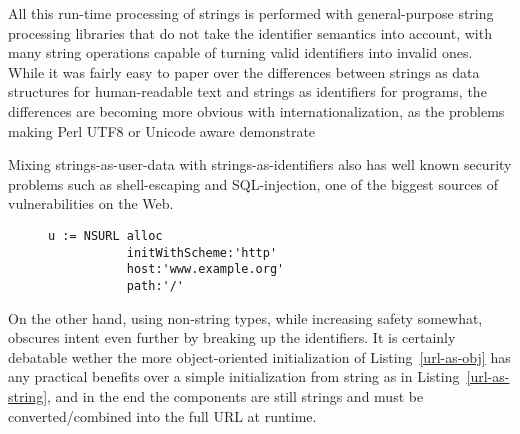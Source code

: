 \documentclass[preprint,authoryear]{acm_proc_article-sp}
\begin{document}
All this run-time processing of strings is performed with general-purpose string
processing libraries that do not take the identifier semantics into account, with
many string operations capable of turning valid identifiers into invalid ones.
While it was fairly easy to paper over the differences between strings as 
data structures for human-readable text and strings as identifiers for programs,
the differences are becoming more obvious with internationalization, as the
problems making Perl UTF8 or Unicode aware demonstrate \cite{perl-unicode}

Mixing strings-as-user-data with strings-as-identifiers also has well known
security problems such as shell-escaping and SQL-injection, one of the
biggest sources of vulnerabilities on the Web.


\begin{figure}[htbp]
\begin{lstlisting}[style=L,label=url-as-obj,caption=URL initialized in an object-oriented fashion.]
u := NSURL alloc
           initWithScheme:'http'
           host:'www.example.org'
           path:'/' 
\end{lstlisting}
\end{figure}

On the other hand, using non-string types, while increasing safety somewhat,
obscures intent even further by breaking up the identifiers.
It is certainly debatable wether the more object-oriented
initialization of Listing~\ref{url-as-obj}  has any practical benefits over a
simple initialization from string as in Listing~\ref{url-as-string}, and in
the end the components are still strings and must be converted/combined
into the full URL at runtime.

\end{document}
